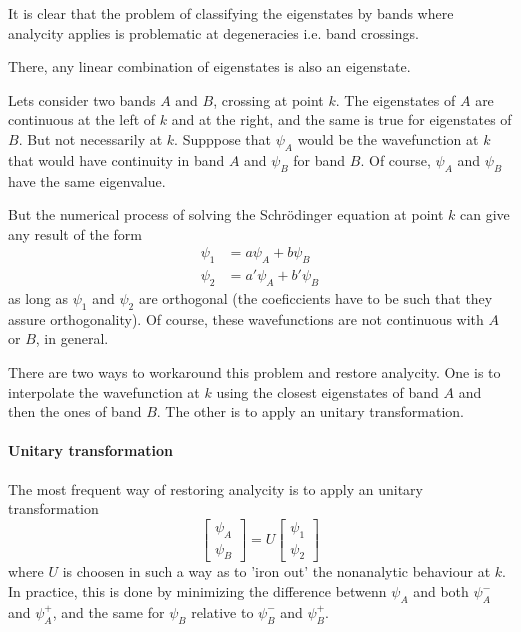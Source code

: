 \documentclass[a4paper,12pt]{report}
\begin{document}
It is clear that the problem of classifying the eigenstates by bands where analycity applies is
 problematic at degeneracies i.e. band crossings.

There, any linear combination of eigenstates is also an eigenstate.

Lets consider two bands $A$ and $B$, crossing at point $k$.
The eigenstates of $A$ are continuous at the left of $k$ and at the right, and the same is true for eigenstates of $B$.
But not necessarily at $k$.
Supppose that $\psi_A$ would be the wavefunction at $k$ that would have continuity in band $A$
and $\psi_B$ for band $B$. Of course, $\psi_A$ and $\psi_B$ have the same eigenvalue.

But the numerical process of solving the Schr\"odinger equation at point $k$ can give any result of the form
\begin{align}
 \psi_1 &= a\psi_A + b\psi_B \\
 \psi_2 &= a'\psi_A + b'\psi_B
\end{align}
as long as $\psi_1$ and $\psi_2$ are orthogonal (the coeficcients have to be such that they assure orthogonality).
Of course, these wavefunctions are not continuous with $A$ or $B$, in general.

There are two ways to workaround this problem and restore analycity.
One is to interpolate the wavefunction at $k$ using the closest eigenstates of band $A$ and then the ones of band $B$.
The other is to apply an unitary transformation.


\paragraph*{Unitary transformation}
The most frequent way of restoring analycity is to apply an unitary transformation
\begin{equation}
 \left[ \begin{matrix}
  \psi_A\\\psi_B
 \end{matrix}\right] = U
 \left[ \begin{matrix}
  \psi_1\\\psi_2
 \end{matrix}\right]
\end{equation}
where $U$ is choosen in such a way as to 'iron out' the nonanalytic behaviour at $k$.
In practice, this is done by minimizing the difference betwenn $\psi_A$ and both $\psi_A^-$ and $\psi_A^+$,
and the same for $\psi_B$ relative to $\psi_B^-$ and $\psi_B^+$.
\end{document}
